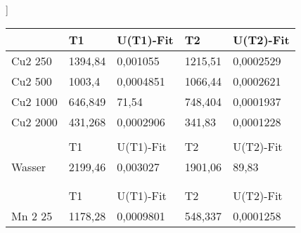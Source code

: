 \begin{table}[H]
    \centering]
    \begin{tabular}{lllll}
    \hline
    \multicolumn{1}{|l|}{}            & \multicolumn{1}{l|}{T1}      & \multicolumn{1}{l|}{U(T1)-Fit} & \multicolumn{1}{l|}{T2}      & \multicolumn{1}{l|}{U(T2)-Fit}  \\ \hline
    \multicolumn{1}{|l|}{Cu2    250}  & \multicolumn{1}{l|}{1394,84} & \multicolumn{1}{l|}{0,001055}  & \multicolumn{1}{l|}{1215,51} & \multicolumn{1}{l|}{0,0002529}  \\ \hline
    \multicolumn{1}{|l|}{Cu2    500}  & \multicolumn{1}{l|}{1003,4}  & \multicolumn{1}{l|}{0,0004851} & \multicolumn{1}{l|}{1066,44} & \multicolumn{1}{l|}{0,0002621}  \\ \hline
    \multicolumn{1}{|l|}{Cu2    1000} & \multicolumn{1}{l|}{646,849} & \multicolumn{1}{l|}{71,54}     & \multicolumn{1}{l|}{748,404} & \multicolumn{1}{l|}{0,0001937}  \\ \hline
    \multicolumn{1}{|l|}{Cu2    2000} & \multicolumn{1}{l|}{431,268} & \multicolumn{1}{l|}{0,0002906} & \multicolumn{1}{l|}{341,83}  & \multicolumn{1}{l|}{0,0001228}  \\ \hline
                                      &                              &                                &                              &                                 \\ \hline
    \multicolumn{1}{|l|}{}            & \multicolumn{1}{l|}{T1}      & \multicolumn{1}{l|}{U(T1)-Fit} & \multicolumn{1}{l|}{T2}      & \multicolumn{1}{l|}{U(T2)-Fit}  \\ \hline
    \multicolumn{1}{|l|}{Wasser}      & \multicolumn{1}{l|}{2199,46} & \multicolumn{1}{l|}{0,003027}  & \multicolumn{1}{l|}{1901,06} & \multicolumn{1}{l|}{89,83}      \\ \hline
                                      &                              &                                &                              &                                 \\
                                      &                              &                                &                              &                                 \\ \hline
    \multicolumn{1}{|l|}{}            & \multicolumn{1}{l|}{T1}      & \multicolumn{1}{l|}{U(T1)-Fit} & \multicolumn{1}{l|}{T2}      & \multicolumn{1}{l|}{U(T2)-Fit}  \\ \hline
    \multicolumn{1}{|l|}{Mn 2 25}     & \multicolumn{1}{l|}{1178,28} & \multicolumn{1}{l|}{0,0009801} & \multicolumn{1}{l|}{548,337} & \multicolumn{1}{l|}{0,0001258}  \\ \hline

\end{tabular}
\end{table}
